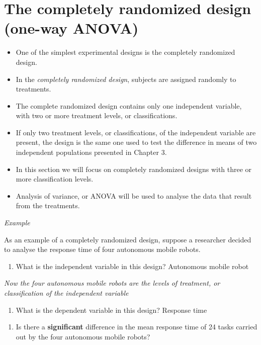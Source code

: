 \documentclass[]{book}
\providecommand{\tightlist}{%
  \setlength{\itemsep}{0pt}\setlength{\parskip}{0pt}}
\begin{document}
\hypertarget{the-completely-randomized-design-one-way-anova}{%
\section{The completely randomized design (one-way ANOVA)}\label{the-completely-randomized-design-one-way-anova}}

\begin{itemize}
\item
  One of the simplest experimental designs is the completely randomized design.
\item
  In the \emph{completely randomized design}, subjects are assigned randomly to treatments.
\item
  The complete randomized design contains only one independent variable, with two or more treatment levels, or classifications.
\item
  If only two treatment levels, or classifications, of the independent variable are present, the design is the same one used to test the difference in means of two independent populations presented in Chapter 3.
\item
  In this section we will focus on completely randomized designs with three or more classification levels.
\item
  Analysis of variance, or ANOVA will be used to analyse the data that result from the treatments.
\end{itemize}

\emph{Example}

As an example of a completely randomized design, suppose a researcher decided to analyse the response time of four autonomous mobile robots.

\begin{enumerate}
\def\labelenumi{\arabic{enumi}.}
\tightlist
\item
  What is the independent variable in this design? Autonomous mobile robot
\end{enumerate}

\emph{Now the four autonomous mobile robots are the levels of treatment, or classification of the independent variable}

\begin{enumerate}
\def\labelenumi{\arabic{enumi}.}
\setcounter{enumi}{1}
\tightlist
\item
  What is the dependent variable in this design? Response time
\end{enumerate}

\begin{enumerate}
\def\labelenumi{\arabic{enumi}.}
\setcounter{enumi}{2}
\tightlist
\item
  Is there a \textbf{significant} difference in the mean response time of 24 tasks carried out by the four autonomous mobile robots?
\end{enumerate}
\end{document}
